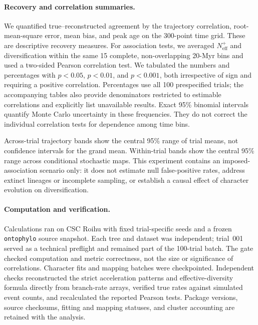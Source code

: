 \paragraph{Recovery and correlation summaries.}
We quantified true--reconstructed agreement by the trajectory correlation,
root-mean-square error, mean bias, and peak age on the 300-point time grid.
These are descriptive recovery measures. For association tests, we averaged
$N_{\mathrm{eff}}^{+}$ and diversification within the same 15 complete,
non-overlapping 20-Myr bins and used a two-sided Pearson correlation test.
We tabulated the numbers and percentages with $p<0.05$, $p<0.01$, and
$p<0.001$, both irrespective of sign and requiring a positive correlation.
Percentages use all 100 prespecified trials; the accompanying tables also
provide denominators restricted to estimable correlations and explicitly
list unavailable results. Exact 95\% binomial intervals quantify Monte Carlo
uncertainty in these frequencies. They do not correct the individual
correlation tests for dependence among time bins.

Across-trial trajectory bands show the central 95\% range of trial means,
not confidence intervals for the grand mean. Within-trial bands show the
central 95\% range across conditional stochastic maps. This experiment
contains an imposed-association scenario only: it does not estimate null
false-positive rates, address extinct lineages or incomplete sampling, or
establish a causal effect of character evolution on diversification.

\paragraph{Computation and verification.}
Calculations ran on CSC Roihu with fixed trial-specific seeds and a frozen
\texttt{ontophylo} source snapshot. Each tree and dataset was independent;
trial~001 served as a technical preflight and remained part of the 100-trial
batch. The gate checked computation and metric correctness, not the size or
significance of correlations. Character fits and mapping batches were
checkpointed. Independent checks reconstructed the strict acceleration
patterns and effective-diversity formula directly from branch-rate arrays,
verified true rates against simulated event counts, and recalculated the
reported Pearson tests. Package versions, source checksums, fitting and
mapping statuses, and cluster accounting are retained with the analysis.
